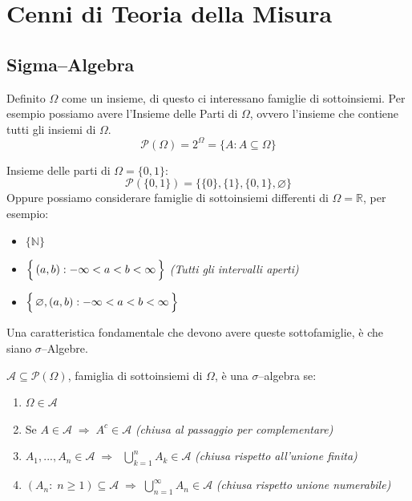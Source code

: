 \mainmatter
\chapter{Cenni di Teoria della Misura}
\section{Sigma--Algebra}
Definito $\Omega$ come un insieme, di questo ci interessano famiglie di sottoinsiemi. Per esempio possiamo avere l'Insieme delle Parti di $\Omega$, ovvero l'insieme che contiene tutti gli insiemi di $\Omega$. 
    \[\mathcal{P}(\Omega) = 2^\Omega = \{A: A\subseteq \Omega\}\]

\begin{esempio}
Insieme delle parti di $\Omega = \{0, 1\}$: \[\mathcal{P}(\{0, 1\}) =\{\{0\}, \{1\}, \{0, 1\}, \varnothing\}\]
Oppure possiamo considerare famiglie di sottoinsiemi differenti di $\Omega = \mathbb{R}$, per esempio:
\begin{itemize}
    \item $\{\mathbb{N}\}$
    \item $\Bigl\{\,(a, b): -\infty < a < b < \infty\,\Bigr\}$ \hfill \textit{(Tutti gli intervalli aperti)}
    \item $\Bigl\{\,\varnothing, (a, b): -\infty < a < b < \infty\,\Bigr\}$
\end{itemize}
\end{esempio}
Una caratteristica fondamentale che devono avere queste sottofamiglie, è che siano $\sigma$--Algebre.
\begin{definizione}
    $\mathcal{A} \subseteq \mathcal{P}(\Omega)$, famiglia di sottoinsiemi di $\Omega$, è una $\sigma$--algebra se:
    \begin{enumerate}
    \item $\Omega \in \mathcal{A}$ 
    \item Se $A \in \mathcal{A} \;\Rightarrow\; A^c \in \mathcal{A}$ \hfill \textit{(chiusa al passaggio per complementare)}
    \item $A_1, ..., A_n \in \mathcal{A} \;\Rightarrow\;$ $\bigcup_{k=1}^{n} A_k \in \mathcal{A}$ \hfill \textit{(chiusa rispetto all'unione finita)}
    \item $(A_n: \; n \geq 1) \subseteq \mathcal{A} \;\Rightarrow\; \bigcup_{n=1}^{\infty} A_n \in \mathcal{A}$ \hfill \textit{(chiusa rispetto unione numerabile)}
\end{enumerate}
\end{definizione}

